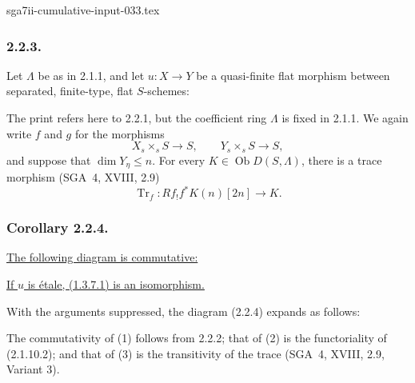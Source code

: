 \begin{filecontents*}{sga7ii-cumulative-input-033.tex}
\subsubsection*{2.2.3.}
Let $\Lambda$ be as in 2.1.1, and let $u:X\longrightarrow Y$ be a
quasi-finite flat morphism between separated, finite-type, flat
$S$-schemes:
\begin{center}
\end{center}
The print refers here to 2.2.1, but the coefficient ring $\Lambda$ is
fixed in 2.1.1.  We again write $f$ and $g$ for the morphisms
\[
X_s\times_sS\longrightarrow S,
\qquad
Y_s\times_sS\longrightarrow S,
\]
and suppose that $\dim Y_\eta\leq n$.  For every
$K\in\operatorname{Ob}D(S,\Lambda)$, there is a trace morphism
(SGA~4, XVIII, 2.9)
\[
\operatorname{Tr}_f:Rf_!f^*K(n)[2n]\longrightarrow K.
\]

\subsubsection*{Corollary 2.2.4.}
\underline{The following diagram is commutative:}
\begin{center}
\end{center}
\underline{If $u$ is \'{e}tale, (1.3.7.1) is an isomorphism.}

With the arguments suppressed, the diagram (2.2.4) expands as
follows:
\begin{center}
\end{center}
The commutativity of (1) follows from 2.2.2; that of (2) is the
functoriality of (2.1.10.2); and that of (3) is the transitivity of the
trace (SGA~4, XVIII, 2.9, Variant 3).


\end{filecontents*}
